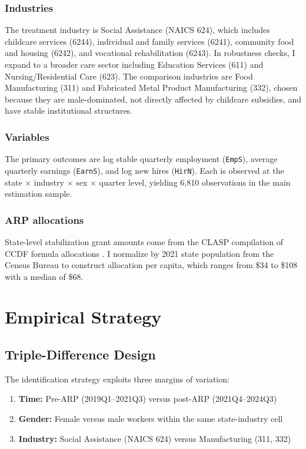 \documentclass[12pt]{article}
\begin{document}
\subsubsection*{Industries} The treatment industry is Social Assistance (NAICS 624), which includes childcare services (6244), individual and family services (6241), community food and housing (6242), and vocational rehabilitation (6243). In robustness checks, I expand to a broader care sector including Education Services (611) and Nursing/Residential Care (623). The comparison industries are Food Manufacturing (311) and Fabricated Metal Product Manufacturing (332), chosen because they are male-dominated, not directly affected by childcare subsidies, and have stable institutional structures.

\subsubsection*{Variables} The primary outcomes are log stable quarterly employment (\texttt{EmpS}), average quarterly earnings (\texttt{EarnS}), and log new hires (\texttt{HirN}). Each is observed at the state $\times$ industry $\times$ sex $\times$ quarter level, yielding 6,810 observations in the main estimation sample.

\subsubsection*{ARP allocations} State-level stabilization grant amounts come from the CLASP compilation of CCDF formula allocations \citep{clasp2021arp}. I normalize by 2021 state population from the Census Bureau to construct allocation per capita, which ranges from \$34 to \$108 with a median of \$68.



\section{Empirical Strategy}

\subsection{Triple-Difference Design}

The identification strategy exploits three margins of variation:

\begin{enumerate}
\item \textbf{Time:} Pre-ARP (2019Q1--2021Q3) versus post-ARP (2021Q4--2024Q3)
\item \textbf{Gender:} Female versus male workers within the same state-industry cell
\item \textbf{Industry:} Social Assistance (NAICS 624) versus Manufacturing (311, 332)
\end{enumerate}
\end{document}
